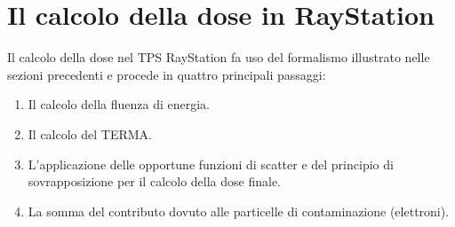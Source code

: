 {\section{Il calcolo della dose in RayStation}
Il calcolo della dose nel TPS RayStation fa uso del formalismo illustrato nelle sezioni precedenti e procede in quattro principali passaggi:
\begin{enumerate}
\item Il calcolo della fluenza di energia.
\item Il calcolo del TERMA.
\item L'applicazione delle opportune funzioni di scatter e del principio di sovrapposizione per il calcolo della dose finale.
\item La somma del contributo dovuto alle particelle di contaminazione (elettroni).
\end{enumerate}

}
